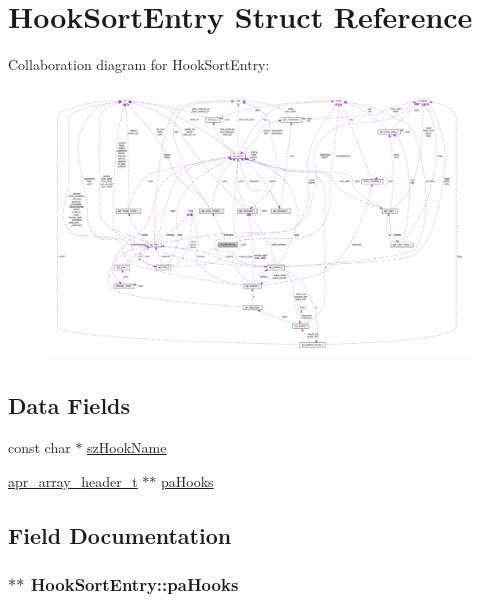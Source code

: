 \hypertarget{structHookSortEntry}{}\section{Hook\+Sort\+Entry Struct Reference}
\label{structHookSortEntry}


Collaboration diagram for Hook\+Sort\+Entry\+:
\nopagebreak
\begin{figure}[H]
\begin{center}
\leavevmode
\includegraphics[width=350pt]{structHookSortEntry__coll__graph}
\end{center}
\end{figure}
\subsection*{Data Fields}
\begin{DoxyCompactItemize}
\item 
const char $\ast$ \hyperlink{structHookSortEntry_a4b11a479edbe6477f3edad848807f5f6}{sz\+Hook\+Name}
\item 
\hyperlink{structapr__array__header__t}{apr\+\_\+array\+\_\+header\+\_\+t} $\ast$$\ast$ \hyperlink{structHookSortEntry_a790dba4bb466f5f69df9538f1aa1437e}{pa\+Hooks}
\end{DoxyCompactItemize}


\subsection{Field Documentation}
\subsubsection[{\texorpdfstring{pa\+Hooks}{paHooks}}]{$\ast$$\ast$ Hook\+Sort\+Entry\+::pa\+Hooks}\hypertarget{structHookSortEntry_a790dba4bb466f5f69df9538f1aa1437e}{}\label{structHookSortEntry_a790dba4bb466f5f69df9538f1aa1437e}
